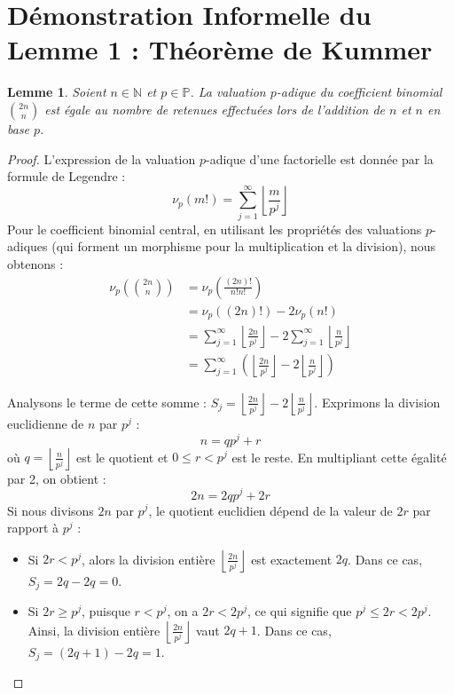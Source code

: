 \documentclass[12pt,a4paper]{article}
\newtheorem{lemma}{Lemme}
\begin{document}
\newpage
\section{Démonstration Informelle du Lemme 1 : Théorème de Kummer}

\begin{lemma}
Soient $n \in \mathbb{N}$ et $p \in \mathbb{P}$. La valuation $p$-adique du coefficient binomial $\binom{2n}{n}$ est égale au nombre de retenues effectuées lors de l'addition de $n$ et $n$ en base $p$.
\end{lemma}

\begin{proof}
L'expression de la valuation $p$-adique d'une factorielle est donnée par la formule de Legendre :
\begin{equation}
\nu_p(m!) = \sum_{j=1}^{\infty} \left\lfloor \frac{m}{p^j} \right\rfloor
\end{equation}
Pour le coefficient binomial central, en utilisant les propriétés des valuations $p$-adiques (qui forment un morphisme pour la multiplication et la division), nous obtenons :
\begin{align*}
\nu_p\left( \binom{2n}{n} \right) &= \nu_p\left( \frac{(2n)!}{n! n!} \right) \\
&= \nu_p((2n)!) - 2\nu_p(n!) \\
&= \sum_{j=1}^{\infty} \left\lfloor \frac{2n}{p^j} \right\rfloor - 2 \sum_{j=1}^{\infty} \left\lfloor \frac{n}{p^j} \right\rfloor \\
&= \sum_{j=1}^{\infty} \left( \left\lfloor \frac{2n}{p^j} \right\rfloor - 2 \left\lfloor \frac{n}{p^j} \right\rfloor \right)
\end{align*}

Analysons le terme de cette somme : $S_j = \left\lfloor \frac{2n}{p^j} \right\rfloor - 2 \left\lfloor \frac{n}{p^j} \right\rfloor$.
Exprimons la division euclidienne de $n$ par $p^j$ :
\begin{equation}
n = q p^j + r
\end{equation}
où $q = \left\lfloor \frac{n}{p^j} \right\rfloor$ est le quotient et $0 \le r < p^j$ est le reste.
En multipliant cette égalité par 2, on obtient :
\begin{equation}
2n = 2q p^j + 2r
\end{equation}
Si nous divisons $2n$ par $p^j$, le quotient euclidien dépend de la valeur de $2r$ par rapport à $p^j$ :
\begin{itemize}
\item Si $2r < p^j$, alors la division entière $\left\lfloor \frac{2n}{p^j} \right\rfloor$ est exactement $2q$. Dans ce cas, $S_j = 2q - 2q = 0$.
\item Si $2r \ge p^j$, puisque $r < p^j$, on a $2r < 2p^j$, ce qui signifie que $p^j \le 2r < 2p^j$.
Ainsi, la division entière $\left\lfloor \frac{2n}{p^j} \right\rfloor$ vaut $2q + 1$.
Dans ce cas, $S_j = (2q + 1) - 2q = 1$.
\end{itemize}


\end{proof}
\end{document}
